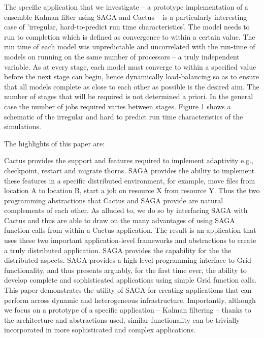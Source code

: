 \documentclass[conference,final]{IEEEtran}
\begin{document}


The specific application that we investigate -- a prototype
implementation of a ensemble Kalman filter using SAGA and Cactus -- is
a particularly interesting case of 'irregular, hard-to-predict run
time characteristics'.  The model needs to run to completion which is
defined as convergence to within a certain value.  The run time of
each model was unpredictable and uncorrelated with the run-time of
models on running on the same number of processors -- a truly
independent variable.  As at every stage, each model must converge to
within a specified value before the next stage can begin, hence
dynamically load-balancing so as to ensure that all models complete as
close to each other as possible is the desired aim.  The number of
stages that will be required is not determined a priori. In the
general case the number of jobs required varies between stages.
Figure 1 shows a schematic of the irregular and hard to predict run
time characteristics of the simulations.

\noindent The highlights of this paper are:

Cactus provides the support and features required to implement
adaptivity e.g., checkpoint, restart and migrate thorns. SAGA provides
the ability to implement these features in a specific distributed
environment, for example, move files from location A to location B,
start a job on resource X from resource Y.  Thus the two programming
abstractions that Cactus and SAGA provide are natural complements of
each other.  As alluded to, we do so by interfacing SAGA with Cactus
and thus are able to draw on the many advantages of using SAGA
function calls from within a Cactus application.  The result is an
application that uses these two important application-level frameworks
and abstractions to create a truly distributed application.  SAGA
provides the capability for the the distributed aspects. SAGA provides
a high-level programming interface to Grid functionality, and thus
presents arguably, for the first time ever, the ability to develop
complete and sophisticated applications using simple Grid function
calls.  This paper demonstrates the utility of SAGA for creating
applications that can perform across dynamic and heterogeneous
infrastructure.  Importantly, although we focus on a prototype of a
specific application -- Kalman filtering -- thanks to the architecture
and abstractions used, similar functionality can be trivially
incorporated in more sophisticated and complex applications.
\end{document}

